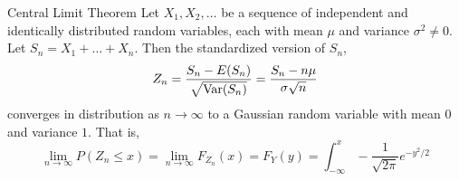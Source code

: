 \documentclass[a4paper]{article}
\begin{document}
\begin{thm}{Central Limit Theorem}{} Let $X_1,X_2,\dots$ be a sequence of independent and identically distributed random variables, each with mean $\mu$ and variance $\sigma^2\neq 0$. Let $S_n=X_1+\dots+X_n$. Then the standardized version of $S_n$, $$Z_n=\frac{S_n-E(S_n)}{\sqrt{\operatorname{Var}(S_n)}}=\frac{S_n-n\mu}{\sigma\sqrt{n}}$$ converges in distribution as $n\to\infty$ to a Gaussian random variable with mean $0$ and variance $1$. That is, $$\lim_{n\to\infty}P(Z_n\leq x)=\lim_{n\to\infty}F_{Z_n}(x)=F_Y(y)=\int_{-\infty}^{x}-\frac{1}{\sqrt{2\pi}}e^{-y^2/2}$$
\end{thm}
\end{document}
